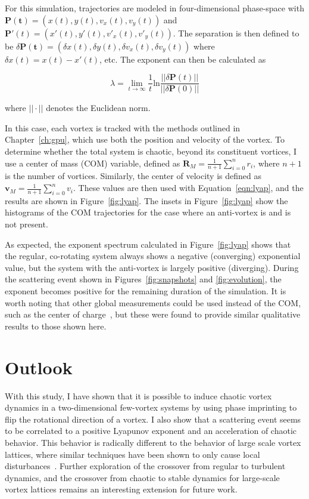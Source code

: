 For this simulation, trajectories are modeled in four-dimensional phase-space with $\mathbf{P(t)} = (x(t), y(t), v_x(t), v_y(t))$ and $\mathbf{P}'(t) = (x'(t), y'(t), v'_x(t), v'_y(t))$.
The separation is then defined to be $\delta \mathbf{P(t)} = (\delta x(t), \delta y(t), \delta v_x(t), \delta v_y(t))$ where $\delta x(t) = x(t) - x'(t)$, etc.
The exponent can then be calculated as

\begin{equation}
\lambda = \lim_{t\to\infty}\frac{1}{t}\text{ln}\frac{||\delta\textbf{P}(t)||}{||\delta\textbf{P}(0)||}
\label{eqn:lyap}
\end{equation}

\noindent where $||\cdot||$ denotes the Euclidean norm.

In this case, each vortex is tracked with the methods outlined in Chapter~\ref{ch:gpu}, which use both the position and velocity of the vortex.
To determine whether the total system is chaotic, beyond its constituent vortices, I use a center of mass (COM) variable, defined as $\mathbf{R}_M = \frac{1}{n+1}\sum_{i=0}^nr_i$, where $n+1$ is the number of vortices.
Similarly, the center of velocity is defined as $\mathbf{v}_M = \frac{1}{n+1}\sum_{i=0}^nv_i$.
These values are then used with Equation~\eqref{eqn:lyap}, and the results are shown in Figure~\ref{fig:lyap}.
The insets in Figure~\ref{fig:lyap} show the histograms of the COM trajectories for the case where an anti-vortex is and is not present.

As expected, the exponent spectrum calculated in Figure~\ref{fig:lyap} shows that the regular, co-rotating system always shows a negative (converging) exponential value, but the system with the anti-vortex is largely positive (diverging).
During the scattering event shown in Figures~\ref{fig:snapshots} and \ref{fig:evolution}, the exponent becomes positive for the remaining duration of the simulation.
It is worth noting that other global measurements could be used instead of the COM, such as the center of charge~\cite{kyriakopoulos2014}, but these were found to provide similar qualitative results to those shown here.


\section{Outlook}

With this study, I have shown that it is possible to induce chaotic vortex dynamics in a two-dimensional few-vortex systems by using phase imprinting to flip the rotational direction of a vortex.
I also show that a scattering event seems to be correlated to a positive Lyapunov exponent and an acceleration of chaotic behavior.
This behavior is radically different to the behavior of large scale vortex lattices, where similar techniques have been shown to only cause local disturbances~\cite{o2016topo}.
Further exploration of the crossover from regular to turbulent dynamics, and the crossover from chaotic to stable dynamics for large-scale vortex lattices remains an interesting extension for future work.


